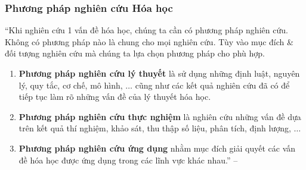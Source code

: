 \documentclass[oneside]{book}
\numberwithin{equation}{section}
\begin{document}
\subsubsection{Phương pháp nghiên cứu Hóa học}
``Khi nghiên cứu 1 vấn đề hóa học, chúng ta cần có phương pháp nghiên cứu. Không có phương pháp nào là chung cho mọi nghiên cứu. Tùy vào mục đích \& đối tượng nghiên cứu mà chúng ta lựa chọn phương pháp cho phù hợp.
\begin{enumerate}
	\item \textbf{Phương pháp nghiên cứu lý thuyết} là sử dụng những định luật, nguyên lý, quy tắc, cơ chế, mô hình, $\ldots$ cũng như các kết quả nghiên cứu đã có để tiếp tục làm rõ những vấn đề của lý thuyết hóa học.
	\item \textbf{Phương pháp nghiên cứu thực nghiệm} là nghiên cứu những vấn đề dựa trên kết quả thí nghiệm, khảo sát, thu thập số liệu, phân tích, định lượng, $\ldots$
	\item \textbf{Phương pháp nghiên cứu ứng dụng} nhằm mục đích giải quyết các vấn đề hóa học được ứng dụng trong các lĩnh vực khác nhau.'' -- \cite[p. 10]{SGK_Hoa_Hoc_10_Chan_Troi_Sang_Tao}
\end{enumerate}
\end{document}
